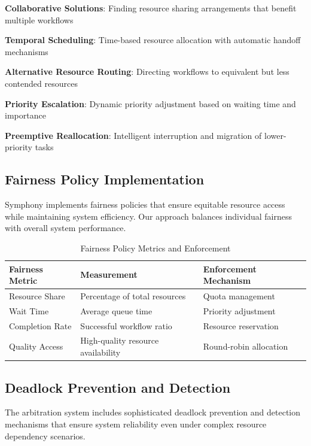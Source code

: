 \begin{expandedlist}
    \item \textbf{Collaborative Solutions}: Finding resource sharing arrangements that benefit multiple workflows
    \item \textbf{Temporal Scheduling}: Time-based resource allocation with automatic handoff mechanisms
    \item \textbf{Alternative Resource Routing}: Directing workflows to equivalent but less contended resources
    \item \textbf{Priority Escalation}: Dynamic priority adjustment based on waiting time and importance
    \item \textbf{Preemptive Reallocation}: Intelligent interruption and migration of lower-priority tasks
\end{expandedlist}

\subsection*{Fairness Policy Implementation}

Symphony implements fairness policies that ensure equitable resource access while maintaining system efficiency. Our approach balances individual fairness with overall system performance.

\begin{table}[ht]
\centering
\begin{tabular}{@{}lll@{}}
\toprule
\textbf{Fairness Metric} & \textbf{Measurement} & \textbf{Enforcement Mechanism} \\
\midrule
Resource Share & Percentage of total resources & Quota management \\
Wait Time & Average queue time & Priority adjustment \\
Completion Rate & Successful workflow ratio & Resource reservation \\
Quality Access & High-quality resource availability & Round-robin allocation \\
\bottomrule
\end{tabular}
\caption{Fairness Policy Metrics and Enforcement}
\end{table}

\subsection*{Deadlock Prevention and Detection}

The arbitration system includes sophisticated deadlock prevention and detection mechanisms that ensure system reliability even under complex resource dependency scenarios.


